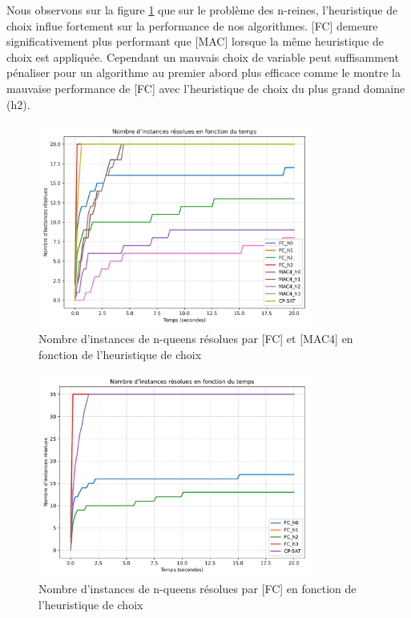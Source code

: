 \documentclass[14pt]{article}
\begin{document}
Nous observons sur la figure \ref{fig:n-queens-h1} que sur le problème des n-reines, l'heuristique de choix influe fortement sur la performance de nos algorithmes. [FC] demeure significativement plus performant que [MAC] lorsque la même heuristique de choix est appliquée. Cependant un mauvais choix de variable peut suffisamment pénaliser pour un algorithme au premier abord plus efficace comme le montre la mauvaise performance de [FC] avec l'heuristique de choix du plus grand domaine (h2).

\begin{figure}[H]
	\centering
	\includegraphics[width=0.8\textwidth]{Images/n-queens-h-MAC-FC.png}
	\caption{Nombre d'instances de n-queens résolues par [FC] et [MAC4] en fonction de l'heuristique de choix}
	\label{fig:n-queens-h1}
\end{figure}

\begin{figure}[H]
	\centering
	\includegraphics[width=0.8\textwidth]{Images/n-queens-h-FC.pdf}
	\caption{Nombre d'instances de n-queens résolues par [FC] en fonction de l'heuristique de choix}
	\label{fig:n-queens-h2}
\end{figure}
\end{document}
